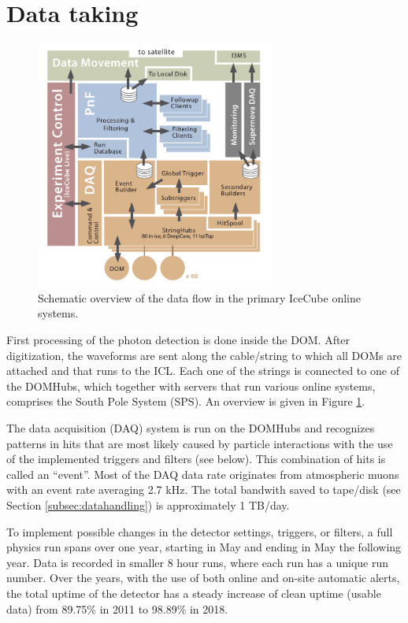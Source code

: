 \section{Data taking}
\label{sec:datataking}

\begin{figure}[ht]
\centering
\includegraphics[width=0.7\textwidth]{chapter5/img/dataflow.png}
\caption{Schematic overview of the data flow in the primary IceCube online systems.}
\label{fig:dataflow}
\end{figure}
First processing of the photon detection is done inside the DOM. After digitization, the waveforms are sent along the cable/string to which all DOMs are attached and that runs to the ICL. Each one of the strings is connected to one of the DOMHubs, which together with servers that run various online systems, comprises the South Pole System (SPS). An overview is given in Figure \ref{fig:dataflow}.

The data acquisition (DAQ) system is run on the DOMHubs and recognizes patterns in hits that are most likely caused by particle interactions with the use of the implemented triggers and filters (see below). This combination of hits is called an ``event''. Most of the DAQ data rate originates from atmospheric muons with an event rate averaging 2.7 kHz. The total bandwith saved to tape/disk (see Section \ref{subsec:datahandling}) is approximately 1 TB/day.

To implement possible changes in the detector settings, triggers, or filters, a full physics run spans over one year, starting in May and ending in May the following year. Data is recorded in smaller 8 hour runs, where each run has a unique run number. Over the years, with the use of both online and on-site automatic alerts, the total uptime of the detector has a steady increase of clean uptime (usable data) from 89.75\% in 2011 to 98.89\% in 2018.

